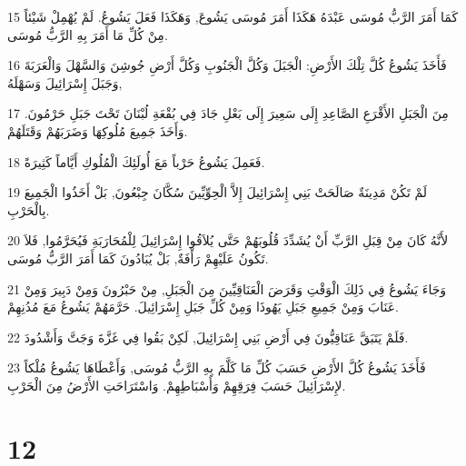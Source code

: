 \par 15 كَمَا أَمَرَ الرَّبُّ مُوسَى عَبْدَهُ هَكَذَا أَمَرَ مُوسَى يَشُوعَ, وَهَكَذَا فَعَلَ يَشُوعُ. لَمْ يُهْمِلْ شَيْئاً مِنْ كُلِّ مَا أَمَرَ بِهِ الرَّبُّ مُوسَى.
\par 16 فَأَخَذَ يَشُوعُ كُلَّ تِلْكَ الأَرْضِ: الْجَبَلَ وَكُلَّ الْجَنُوبِ وَكُلَّ أَرْضِ جُوشِنَ وَالسَّهْلَ وَالْعَرَبَةَ وَجَبَلَ إِسْرَائِيلَ وَسَهْلَهُ,
\par 17 مِنَ الْجَبَلِ الأَقْرَعِ الصَّاعِدِ إِلَى سَعِيرَ إِلَى بَعْلِ جَادَ فِي بُقْعَةِ لُبْنَانَ تَحْتَ جَبَلِ حَرْمُونَ. وَأَخَذَ جَمِيعَ مُلُوكِهَا وَضَرَبَهُمْ وَقَتَلَهُمْ.
\par 18 فَعَمِلَ يَشُوعُ حَرْباً مَعَ أُولَئِكَ الْمُلُوكِ أَيَّاماً كَثِيرَةً.
\par 19 لَمْ تَكُنْ مَدِينَةٌ صَالَحَتْ بَنِي إِسْرَائِيلَ إِلاَّ الْحِوِّيِّينَ سُكَّانَ جِبْعُونَ, بَلْ أَخَذُوا الْجَمِيعَ بِالْحَرْبِ.
\par 20 لأَنَّهُ كَانَ مِنْ قِبَلِ الرَّبِّ أَنْ يُشَدِّدَ قُلُوبَهُمْ حَتَّى يُلاَقُوا إِسْرَائِيلَ لِلْمُحَارَبَةِ فَيُحَرَّمُوا, فَلاَ تَكُونُ عَلَيْهِمْ رَأْفَةٌ, بَلْ يُبَادُونَ كَمَا أَمَرَ الرَّبُّ مُوسَى.
\par 21 وَجَاءَ يَشُوعُ فِي ذَلِكَ الْوَقْتِ وَقَرَضَ الْعَنَاقِيِّينَ مِنَ الْجَبَلِ, مِنْ حَبْرُونَ وَمِنْ دَبِيرَ وَمِنْ عَنَابَ وَمِنْ جَمِيعِ جَبَلِ يَهُوذَا وَمِنْ كُلِّ جَبَلِ إِسْرَائِيلَ. حَرَّمَهُمْ يَشُوعُ مَعَ مُدُنِهِمْ.
\par 22 فَلَمْ يَتَبَقَّ عَنَاقِيُّونَ فِي أَرْضِ بَنِي إِسْرَائِيلَ, لَكِنْ بَقُوا فِي غَزَّةَ وَجَتَّ وَأَشْدُودَ.
\par 23 فَأَخَذَ يَشُوعُ كُلَّ الأَرْضِ حَسَبَ كُلِّ مَا كَلَّمَ بِهِ الرَّبُّ مُوسَى, وَأَعْطَاهَا يَشُوعُ مُلْكاً لإِسْرَائِيلَ حَسَبَ فِرَقِهِمْ وَأَسْبَاطِهِمْ. وَاسْتَرَاحَتِ الأَرْضُ مِنَ الْحَرْبِ.

\chapter{12}

